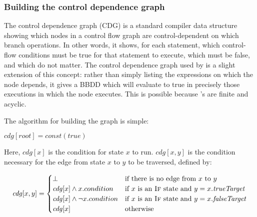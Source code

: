 
\subsubsection{Building the control dependence graph}

The control dependence graph (CDG) is a standard compiler data
structure\needCite{} showing which nodes in a control flow graph are
control-dependent on which branch operations.  In other words, it
shows, for each statement, which control-flow conditions must be true
for that statement to execute, which must be false, and which do not
matter.  The control dependence graph used by {\technique} is a slight
extension of this concept: rather than simply listing the expressions
on which the node depends, it gives a BBDD which will evaluate to true
in precisely those executions in which the node executes.  This is
possible because {\technique}'s {\StateMachines} are finite and
acyclic.

The algorithm for building the graph is simple:

\begin{algorithmic}[1]
\State $\mathit{cdg}[\mathit{root}] = \mathit{const}(\mathit{true})$
\EndWhile
\end{algorithmic}

Here, $\mathit{cdg}[x]$ is the condition for state $x$ to run.
$\mathit{cdg}[x, y]$ is the condition necessary for the edge from
state $x$ to $y$ to be traversed, defined by:

\begin{displaymath}
\mathit{cdg}[x, y] = \begin{cases}
  \bot                                     & \text{if there is no edge from $x$ to $y$} \\
  \mathit{cdg}[x] \wedge x.condition       & \text{if $x$ is an \textsc{If} state and $y = x.\mathit{trueTarget}$} \\
  \mathit{cdg}[x] \wedge {\neg}x.condition & \text{if $x$ is an \textsc{If} state and $y = x.\mathit{falseTarget}$} \\
  \mathit{cdg}[x]                          & \text{otherwise}
\end{cases}
\end{displaymath}


